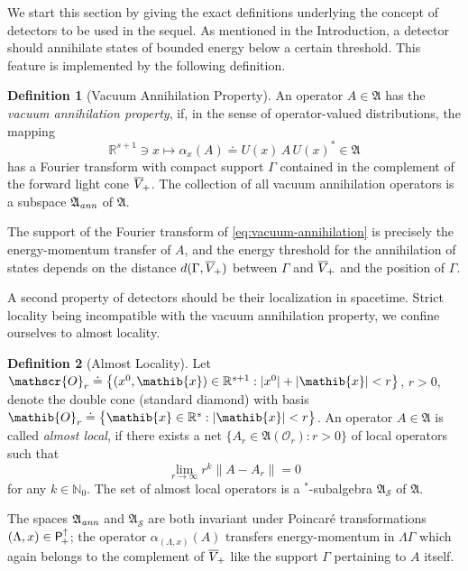 \documentclass[a4paper,a4paper]{article}
\numberwithin{equation}{section}
\newcommand{\Nbb}{\mathbb{N}}
\newcommand{\Afrak}{\mathfrak{A}}
\newcommand{\Oib}{\mathib{O}}
\newcommand{\xib}{\mathib{x}}
\newcommand{\Oscr}{\mathscr{O}}
\newcommand{\Rs}{\mathbb{R}^s}
\newcommand{\Rsone}{\mathbb{R}^{s + 1}}
\newcommand{\AS}{\mathfrak{A}_{\mathscr{S}}}
\newcommand{\Aann}{\mathfrak{A}_{\text{\itshape ann}}}
\newcommand{\Poin}{\mathsf{P}_{\negthinspace +}^\uparrow}
\newcommand{\fwcone}{\overline{V}_{\negthinspace +}}
\newcommand{\aLax}{\alpha_{( \Lambda , x )}}
\newcommand{\ax}{\alpha_x}
\newcommand{\AOr}{\mathfrak{A} ( \mathscr{O}_r )}
\theoremstyle{definition}
\newtheorem{definition}{Definition}[section]
\theoremstyle{plain}
\theoremstyle{remark}
\newcommand{\bset}[1]{\bigl\{ #1 \bigr\}}
\newcommand{\abs}[1]{\lvert #1 \rvert}
\newcommand{\norm}[1]{\lVert #1 \rVert}
\begin{document}
  We start this section by giving the exact definitions underlying the
  concept of detectors to be used in the sequel. As mentioned in the
  Introduction, a detector should annihilate states of bounded energy
  below a certain threshold. This feature is implemented by the
  following definition.
  \begin{definition}[Vacuum Annihilation Property]
    \label{def:vacuum-annihilation}
    An operator $A \in \Afrak$ has the \emph{vacuum annihilation
    property}, if, in the sense of operator-valued distributions,
    the mapping
    \begin{equation}
      \label{eq:vacuum-annihilation}
      \Rsone \ni x \mapsto \ax ( A ) \doteq U ( x ) \, A \, U ( x )^*
      \in \Afrak
    \end{equation}
    has a Fourier transform with compact support $\Gamma$ contained in
    the complement of the forward light cone $\fwcone$. The collection
    of all vacuum annihilation operators is a subspace $\Aann$ of
    $\Afrak$.
  \end{definition}
  The support of the Fourier transform of
  \eqref{eq:vacuum-annihilation} is precisely the energy-momen\-tum
  transfer of $A$, and the energy threshold for the annihilation of
  states depends on the distance $d ( \Gamma , \fwcone )$ between
  $\Gamma$ and $\fwcone$ and the position of $\Gamma$.
  
  A second property of detectors should be their localization in
  spacetime. Strict locality being incompatible with the vacuum
  annihilation property, we confine ourselves to almost locality.
  \begin{definition}[Almost Locality]
    \label{def:almost-locality}
    Let $\Oscr_r \doteq \bset{( x^0 , \xib ) \in \Rsone : \abs{x^0} +
    \abs{\xib} < r}$, $r > 0$, denote the double cone (standard
    diamond) with basis $\Oib_r \doteq \bset{\xib \in \Rs : \abs{\xib}
    < r}$. An operator $A \in \Afrak$ is called \emph{almost local},
    if there exists a net $\bset{A_r \in \AOr : r > 0}$ of local
    operators such that
    \begin{equation}
      \label{eq:almost-locality}
      \lim_{r \rightarrow \infty} r^k \norm{A - A_r} = 0
    \end{equation}
    for any $k \in \Nbb_0$. The set of almost local operators is a
    $^*$-subalgebra $\AS$ of $\Afrak$.
  \end{definition}
  The spaces $\Aann$ and $\AS$ are both invariant under Poincar\'e
  transformations $( \Lambda , x ) \in \Poin$; the operator $\aLax ( A
  )$ transfers energy-momentum in $\Lambda \Gamma$ which again
  belongs to the complement of $\fwcone$ like the support $\Gamma$
  pertaining to $A$ itself.
  
\end{document}

